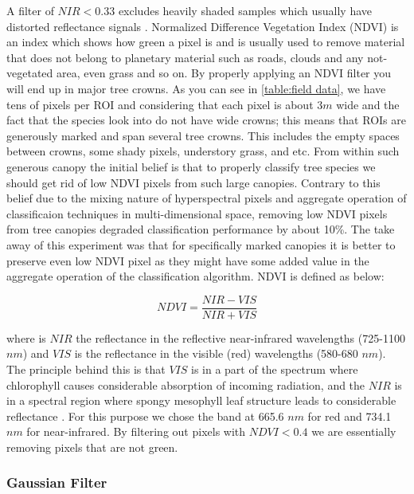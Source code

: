 \documentclass[remotesensing,article,accept,moreauthors,pdftex,12pt,a4paper]{mdpi}
\begin{document}
A filter of $NIR < 0.33$  excludes heavily shaded samples  which usually have distorted reflectance signals \cite{colgan2012mapping}. 
Normalized Difference Vegetation Index (NDVI) is an index which shows how green a pixel is and is usually used to remove material that does not belong to planetary material such as roads, clouds and any not-vegetated area, even grass and so on. By properly applying an NDVI filter you will end up in major tree crowns.
As you can see in \ref{table:field data}, we have tens of pixels per ROI and considering that each pixel is about $3m$ wide and the fact that the species look into do not have wide crowns; this means that ROIs are generously marked and span several tree crowns. 
This includes the empty spaces between crowns, some shady pixels, understory grass, and etc. 
From within such generous canopy the initial belief is that to properly classify tree species we should get rid of low NDVI pixels from such large canopies. 
Contrary to this belief due to the mixing nature of hyperspectral pixels and aggregate operation of classificaion techniques in multi-dimensional space, removing low NDVI pixels from tree canopies degraded classification performance by about 10\%. The take away of this experiment was that for specifically marked canopies it is better to preserve even low NDVI pixel as they might have some added value in the aggregate operation of the classification algorithm.
NDVI is defined as below:

\begin{equation}\label{xx}
NDVI  = \frac{NIR - VIS}{NIR + VIS}
\end{equation}

where is $NIR$ the reflectance in the reflective near-infrared wavelengths (725-1100 $n m$) and $VIS$ is the reflectance in the visible (red) wavelengths (580-680 $n m$). 
The principle behind this is that $VIS$ is in a part of the spectrum where chlorophyll causes considerable absorption of incoming radiation, and the $NIR$ is in a spectral region where spongy mesophyll leaf structure leads to considerable reflectance \cite{tucker1979red, jackson1983discrimination}. 
For this purpose we chose the band at 665.6 $n m$ for red and 734.1 $n m$ for near-infrared. 
By filtering out pixels with $NDVI < 0.4$ we are essentially removing pixels that are not green. 

\subsubsection{Gaussian Filter}
\end{document}
